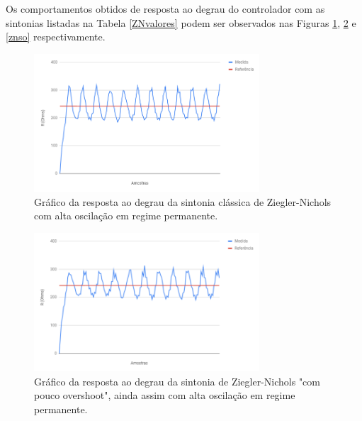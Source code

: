 Os comportamentos obtidos de resposta ao degrau do controlador com as sintonias listadas na Tabela \ref{ZNvalores} podem ser observados nas Figuras \ref{znclass}, \ref{znpo} e \ref{znso} respectivamente.
\begin{figure}[htb]
    \begin{center}
    \includegraphics[width=0.75\textwidth]{figuras/znclass.PNG}
    \end{center}
    \caption[Gráfico da sintonia clássica de Ziegler-Nichols.]{Gráfico da resposta ao degrau da sintonia clássica de Ziegler-Nichols com alta oscilação em regime permanente.}
    \label{znclass}
\end{figure}
\begin{figure}[htb]
    \begin{center}
    \includegraphics[width=0.75\textwidth]{figuras/znpo.PNG}
    \end{center}
    \caption[Gráfico da sintonia de Ziegler-Nichols "com pouco overshoot".]{Gráfico da resposta ao degrau da sintonia de Ziegler-Nichols "com pouco overshoot", ainda assim com alta oscilação em regime permanente.}
    \label{znpo}
\end{figure}

